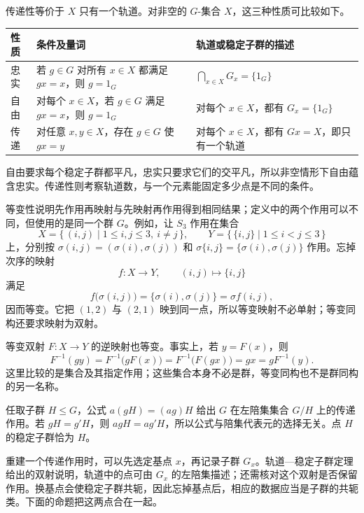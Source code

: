 传递性等价于 \(X\) 只有一个轨道。对非空的 \(G\)-集合 \(X\)，这三种性质可比较如下。

\begin{center}
	\begin{tabularx}{\linewidth}{@{}lXX@{}}
		\toprule
		性质 & 条件及量词 & 轨道或稳定子群的描述 \\
		\midrule
		忠实 & 若 \(g\in G\) 对所有 \(x\in X\) 都满足 \(gx=x\)，则 \(g=1_G\) & \(\displaystyle\bigcap_{x\in X}G_x=\{1_G\}\) \\
		自由 & 对每个 \(x\in X\)，若 \(g\in G\) 满足 \(gx=x\)，则 \(g=1_G\) & 对每个 \(x\in X\)，都有 \(G_x=\{1_G\}\) \\
		传递 & 对任意 \(x,y\in X\)，存在 \(g\in G\) 使 \(gx=y\) & 对每个 \(x\in X\)，都有 \(Gx=X\)，即只有一个轨道 \\
		\bottomrule
	\end{tabularx}
\end{center}

自由要求每个稳定子群都平凡，忠实只要求它们的交平凡，所以非空情形下自由蕴含忠实。传递性则考察轨道数，与一个元素能固定多少点是不同的条件。

\ProseParagraphBreak
等变性说明先作用再映射与先映射再作用得到相同结果；定义中的两个作用可以不同，但使用的是同一个群 \(G\)。例如，让 \(S_3\) 作用在集合
\[
	X=\{\,(i,j)\mid 1\le i,j\le 3,\ i\ne j\,\},\qquad Y=\{\,\{i,j\}\mid 1\le i<j\le 3\,\}
\]
上，分别按 \(\sigma(i,j)=(\sigma(i),\sigma(j))\) 和 \(\sigma\{i,j\}=\{\sigma(i),\sigma(j)\}\) 作用。忘掉次序的映射
\[
	f:X\longrightarrow Y,\qquad (i,j)\longmapsto\{i,j\}
\]
满足
\[
	f\bigl(\sigma(i,j)\bigr) =\{\sigma(i),\sigma(j)\} =\sigma f(i,j),
\]
因而等变。它把 \((1,2)\) 与 \((2,1)\) 映到同一点，所以等变映射不必单射；等变同构还要求映射为双射。

\ProseParagraphBreak
等变双射 \(F:X\rightarrow Y\) 的逆映射也等变。事实上，若 \(y=F(x)\)，则
\[
	F^{-1}(gy)=F^{-1}\bigl(gF(x)\bigr) =F^{-1}\bigl(F(gx)\bigr) =gx=gF^{-1}(y).
\]
这里比较的是集合及其指定作用；这些集合本身不必是群，等变同构也不是群同构的另一名称。

\ProseParagraphBreak
任取子群 \(H\leq G\)，公式 \(a(gH)=(ag)H\) 给出 \(G\) 在左陪集集合 \(G/H\) 上的传递作用。若 \(gH=g'H\)，则 \(agH=ag'H\)，所以公式与陪集代表元的选择无关。点 \(H\) 的稳定子群恰为 \(H\)。

\ProseParagraphBreak
重建一个传递作用时，可以先选定基点 \(x\)，再记录子群 \(G_x\)。轨道—稳定子群定理给出的双射说明，轨道中的点可由 \(G_x\) 的左陪集描述；还需核对这个双射是否保留作用。换基点会使稳定子群共轭，因此忘掉基点后，相应的数据应当是子群的共轭类。下面的命题把这两点合在一起。

